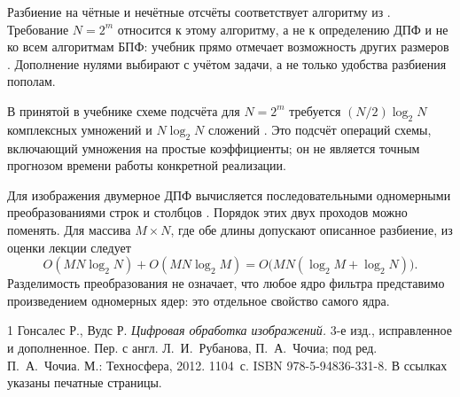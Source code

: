 \documentclass[12pt,a4paper]{article}
\theoremstyle{definition}
\theoremstyle{remark}
\begin{document}
Разбиение на чётные и нечётные отсчёты соответствует алгоритму
из \cite[\S\,4.11.3, с.~353--355]{GW2012}.
Требование $N=2^m$ относится к этому алгоритму, а не к определению
ДПФ и не ко всем алгоритмам БПФ: учебник прямо отмечает возможность
других размеров \cite[\S\,4.11.3, с.~353, 356]{GW2012}.
Дополнение нулями выбирают с учётом задачи, а не только удобства
разбиения пополам.

В принятой в учебнике схеме подсчёта для $N=2^m$ требуется
$(N/2)\log_2N$ комплексных умножений и $N\log_2N$ сложений
\cite[\S\,4.11.3, с.~355]{GW2012}.
Это подсчёт операций схемы, включающий умножения на простые
коэффициенты; он не является точным прогнозом времени работы
конкретной реализации.

Для изображения двумерное ДПФ вычисляется последовательными
одномерными преобразованиями строк и столбцов
\cite[\S\,4.11.1, с.~351--352]{GW2012}.
Порядок этих двух проходов можно поменять. Для массива
$M\times N$, где обе длины допускают описанное разбиение,
из оценки лекции следует
\[
  O(MN\log_2N)+O(MN\log_2M)
  =O\bigl(MN(\log_2M+\log_2N)\bigr).
\]
Разделимость преобразования не означает, что любое ядро фильтра
представимо произведением одномерных ядер: это отдельное свойство
самого ядра.

\begingroup
\small
\begin{thebibliography}{1}
Гонсалес Р., Вудс Р.
\emph{Цифровая обработка изображений.}
3-е изд., исправленное и дополненное.
Пер. с англ. Л.~И.~Рубанова, П.~А.~Чочиа;
под ред. П.~А.~Чочиа. М.: Техносфера, 2012. 1104~с.
ISBN 978-5-94836-331-8.
В ссылках указаны печатные страницы.
\end{thebibliography}
\endgroup
\end{document}
